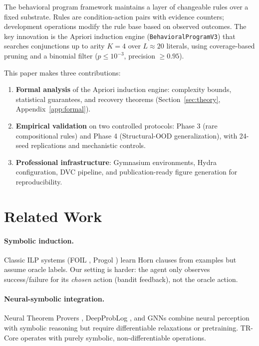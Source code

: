 \documentclass[11pt]{article}
\begin{document}
The behavioral program framework \cite{behavioral_program_spec_v02} maintains a layer of changeable rules over a fixed substrate. Rules are condition-action pairs with evidence counters; development operations modify the rule base based on observed outcomes. The key innovation is the Apriori induction engine (\texttt{BehavioralProgramV3}) that searches conjunctions up to arity $K=4$ over $L \approx 20$ literals, using coverage-based pruning and a binomial filter ($p \leq 10^{-3}$, precision $\geq 0.95$).

This paper makes three contributions:
\begin{enumerate}
    \item \textbf{Formal analysis} of the Apriori induction engine: complexity bounds, statistical guarantees, and recovery theorems (Section~\ref{sec:theory}, Appendix~\ref{app:formal}).
    \item \textbf{Empirical validation} on two controlled protocols: Phase 3 (rare compositional rules) and Phase 4 (Structural-OOD generalization), with 24-seed replications and mechanistic controls.
    \item \textbf{Professional infrastructure}: Gymnasium environments, Hydra configuration, DVC pipeline, and publication-ready figure generation for reproducibility.
\end{enumerate}

\section{Related Work}
\label{sec:related}

\paragraph{Symbolic induction.} Classic ILP systems (FOIL \cite{quinlan1990foil}, Progol \cite{muggleton1995inverse}) learn Horn clauses from examples but assume oracle labels. Our setting is harder: the agent only observes success/failure for its \emph{chosen} action (bandit feedback), not the oracle action.

\paragraph{Neural-symbolic integration.} Neural Theorem Provers \cite{rocktaschel2017end}, DeepProbLog \cite{manhaeve2018deepproblog}, and GNNs \cite{battaglia2018relational} combine neural perception with symbolic reasoning but require differentiable relaxations or pretraining. TR-Core operates with purely symbolic, non-differentiable operations.
\end{document}
